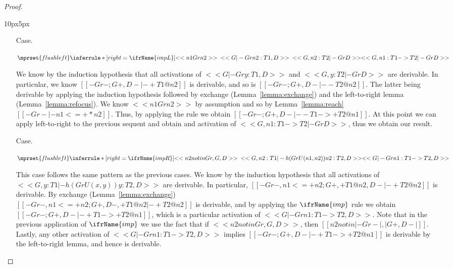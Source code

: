 \begin{proof}
\begin{changemargin}{10px}{5px}
\begin{itemize}
  \item[Case.]\ \\ 
    \begin{center}
      \begin{math}
        $$\mprset{flushleft}
        \inferrule* [right=\ifrName{impL}] {
          <<n1 Gr n2>>
          \\\\
          <<G |- Gr n2 : T1, D>>
          \\\\
          <<G, n2 : T2 |- Gr D>>
        }{<<G , n1 : T1 -> T2 |- Gr D>>}
      \end{math}
    \end{center}   
    We know by the induction hypothesis that all activations of $<<G |- Gr y : T1, D>>$ and 
    $<<G, y : T2 |- Gr D>>$ are derivable.  In particular, we know 
    $[[-Gr-;{G}+,{D}- |- +{T1}@n2]]$ is derivable, and so is $[[-Gr-;{G}+, {D}- |- -{T2}@n2]]$. The latter
    being derivable by applying the induction hypothesis followed by exchange 
    (Lemma~\ref{lemma:exchange}) and the left-to-right lemma (Lemma~\ref{lemma:refocus}). We know $<<n1 Gr n2>>$ by assumption
    and so by Lemma~\ref{lemma:reach} $[[-Gr- |- n1 <=+* n2]]$.  Thus, by applying the  rule we obtain
    $[[-Gr-;{G}+,{D}- |- - {T1}->+{T2} @ n1]]$.  At this point we can apply left-to-right to the previous sequent and obtain 
    and activation of $<<G , n1 : T1 -> T2 |- Gr D>>$, thus we obtain our result.

  \item[Case.]\ \\ 
    \begin{center}
      \begin{math}
        $$\mprset{flushleft}
        \inferrule* [right=\ifrName{impR}] {
          <<n2 notin Gr, G, D>>
          \\\\
          <<G, n2 : T1 |- h(Gr U {(n1,n2)}) n2 : T2, D>>
        }{<<G |- Gr n1 : T1 -> T2, D>>}
      \end{math}
    \end{center}
    This case follows the same pattern as the previous cases.  We know by the induction hypothesis
    that all activations of $<<G, y : T1 |- h(Gr U {(x,y)}) y : T2, D>>$ are derivable.  In particular,
    $[[-Gr-,n1 <=+ n2 ; {G}+, +{T1}@n2,{D}- |- +{T2}@n2]]$ is
    derivable.  By exchange (Lemma~\ref{lemma:exchange})\\
    $[[-Gr-,n1 <=+ n2 ; {G}+, {D}-,+{T1}@n2 |- +{T2}@n2]]$ is derivable, and by applying the $\ifrName{\normalsize imp}$ rule
    we obtain $[[-Gr- ; {G}+, {D}- |- + {T1} ->+ {T2}@n1]]$, which is a particular activation of 
    $<<G |- Gr n1 : T1 -> T2, D>>$.  Note that in the previous application of $\ifrName{\normalsize imp}$ we use
    the fact that if $<<n2 notin Gr, G, D>>$, then $[[n2 notin |-Gr-|,|{G}+,{D}-|]]$. 
    Lastly, any other activation of $<<G |- Gr n1 : T1 -> T2, D>>$ implies
    $[[-Gr- ; {G}+, {D}- |- + {T1} ->+ {T2}@n1]]$ is derivable by the left-to-right lemma, and hence is derivable.


\end{itemize}
\end{changemargin}
\end{proof}
